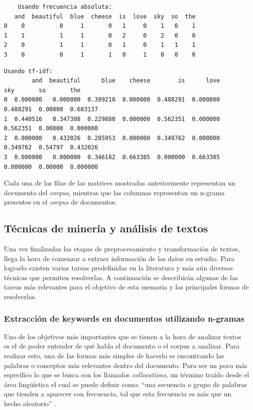 \begin{itemize}
    \begin{lstlisting}
    Usando frecuencia absoluta: 
   and  beautiful  blue  cheese  is  love  sky  so  the
0    0          0     1       0   1     0    1   0    1
1    1          1     1       0   2     0    2   0    0
2    0          1     1       0   1     0    1   1    1
3    0          0     1       1   0     1    0   0    0
    \end{lstlisting}
    \begin{lstlisting}
Usando tf-idf: 
        and  beautiful      blue    cheese        is      love       sky       so       the
0  0.000000   0.000000  0.399210  0.000000  0.488291  0.000000  0.488291  0.00000  0.603137
1  0.440516   0.347308  0.229880  0.000000  0.562351  0.000000  0.562351  0.00000  0.000000
2  0.000000   0.432026  0.285953  0.000000  0.349762  0.000000  0.349762  0.54797  0.432026
3  0.000000   0.000000  0.346182  0.663385  0.000000  0.663385  0.000000  0.00000  0.000000
    \end{lstlisting}
    Cada una de las filas de las matrices mostradas anteriormente representan un documento del \textit{corpus}, mientras que las columnas representan un n-grama presentes en el \textit{corpus} de documentos.  
    \end{itemize}
\subsection{Técnicas de minería y análisis de textos}
    Una vez finalizadas las etapas de preprocesamiento y transformación de textos, llega la hora de comenzar a extraer información de los datos en estudio. Para lograrlo existen varias tareas predefinidas en la literatura y más aún diversas técnicas que permiten resolverlas. A continuación se describirán algunas de las tareas más relevantes para el objetivo de esta memoria y las principales formas de resolverlas.
\subsubsection{Extracción de keywords en documentos utilizando n-gramas}
    Uno de los objetivos más importantes que se tienen a la hora de analizar textos es el de poder entender de qué habla el documento o el corpus a analizar. Para realizar esto, una de las formas más simples de hacerlo es encontrando las palabras o conceptos más relevantes dentro del documento. Para ser un poco más específico lo que se busca son los llamados  \textit{collocations}, un término traído desde el área lingüística el cual se puede definir como:  ``una secuencia o grupo de palabras que tienden a aparecer con frecuencia, tal que esta frecuencia es más que un hecho aleatorio'' \cite{sarkar2016text}. 
    
